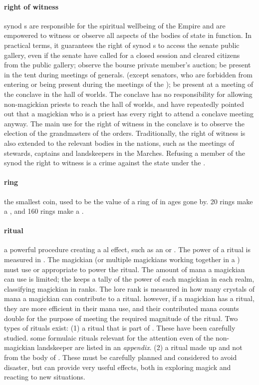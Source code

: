 \paragraph{right of witness} synod s are responsible for the spiritual wellbeing of the Empire and are empowered to witness or observe all aspects of the bodies of state in function. In practical terms, it guarantees the right of synod s to access the senate public gallery, even if the senate have called for a closed session and cleared citizens from the public gallery; observe the bourse private member's auction; be present in the  tent during meetings of generals. (except senators, who are forbidden from entering or being present during the meetings of the ); be present at a meeting of the conclave in the hall of worlds. The conclave has no responsibility for allowing non-magickian priests to reach the hall of worlds, and have repeatedly pointed out that a magickian who is a priest has every right to attend a conclave meeting anyway. \localpar The main use for the right of witness in the conclave is to observe the election of the grandmasters of the orders. Traditionally, the right of witness is also extended to the relevant bodies in the nations, such as the meetings of stewards, captains and landskeepers in the Marches. Refusing a member of the synod the right to witness is a crime against the state under the . 
\paragraph{ring} the smallest coin, used to be the value of a ring of  in ages gone by. 20 rings make a , and 160 rings make a . 
\paragraph{ritual} a powerful procedure creating a al effect, such as an  or . The power of a ritual is measured in . The magickian (or multiple magickians working together in a ) must use  or appropriate  to power the ritual. The amount of mana a magickian can use is limited; the  keeps a tally of the power of each magickian in each realm, classifying magickian in  ranks. The lore rank is measured in how many crystals of mana a magickian can contribute to a ritual. however, if a magickian has  a ritual, they are more efficient in their mana use, and their contributed mana counts double for the purpose of meeting the required magnitude of the ritual. Two types of rituals exist: (1)  a ritual that is part of . These have been carefully studied. some formulaic rituals relevant for the attention even of the non-magickian landskeeper are listed in an \emph{appendix}. (2)  a ritual made up and not from the body of . These must be carefully planned and considered to avoid disaster, but can provide very useful effects, both in exploring magick and reacting to new situations.
